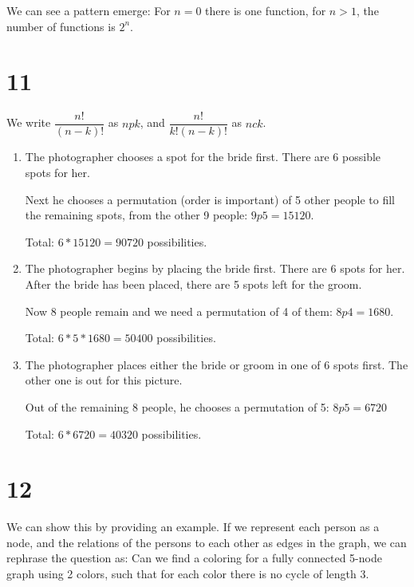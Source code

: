 \documentclass[12pt]{article}
\begin{document}
We can see a pattern emerge: For $n = 0$ there is one function, for $n > 1$, the number of functions is $2^n$.

\section*{11}
We write $\dfrac{n!}{(n - k)!}$ as $n p k$, and $\dfrac{n!}{k!(n - k)!}$ as $n c k$.

\begin{enumerate}[a]
	\item %
	The photographer chooses a spot for the bride first. There are 6 possible spots for her.

	Next he chooses a permutation (order is important) of 5 other people to fill the remaining spots, from the other 9 people: $9p5 = 15120$.

	Total: $6 * 15120 = 90720$ possibilities.
	\item %
	The photographer begins by placing the bride first. There are 6 spots for her. After the bride has been placed, there are 5 spots left for the groom.

	Now 8 people remain and we need a permutation of 4 of them: $8p4 = 1680$.

	Total: $6 * 5 * 1680 = 50400$ possibilities.
	\item %
	The photographer places either the bride or groom in one of 6 spots first. The other one is out for this picture.

	Out of the remaining 8 people, he chooses a permutation of 5: $8p5 = 6720$

	Total: $6 * 6720 = 40320$ possibilities.
\end{enumerate}

\section*{12}
We can show this by providing an example. If we represent each person as a node, and the relations of the persons to each other as edges in the graph, we can rephrase the question as: Can we find a coloring for a fully connected 5-node graph using 2 colors, such that for each color there is no cycle of length 3.

\end{document}
